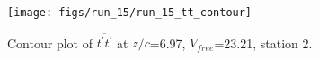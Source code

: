 \begin{figure}[H]
\centering
\texttt{[image: figs/run\_15/run\_15\_tt\_contour]}
\caption{Contour plot of $\overline{t^\prime t^\prime}$ at $z/c$=6.97, $V_{free}$=23.21, station 2.}
\label{fig:run_15_tt_contour}
\end{figure}


